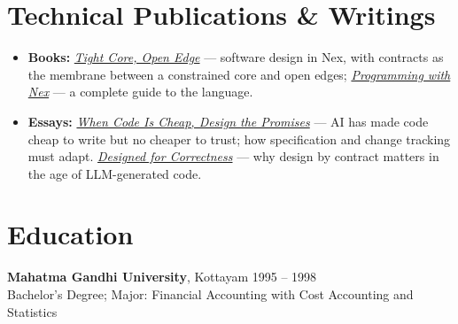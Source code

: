\documentclass[10pt,letterpaper]{article}
\begin{document}
\section*{Technical Publications \& Writings}
\begin{itemize}
  \item \textbf{Books:} \href{https://schemer.in/books/tight-core-open-edge/cover.html}{\textit{Tight Core, Open Edge}} --- software design in Nex, with contracts as the membrane between a constrained core and open edges; \href{https://schemer.in/nex/docs/programming-with-nex/cover.html}{\textit{Programming with Nex}} --- a complete guide to the language.
  \item \textbf{Essays:} \href{https://schemer.in/nex/blog/when-code-is-cheap.html}{\textit{When Code Is Cheap, Design the Promises}} --- AI has made code cheap to write but no cheaper to trust; how specification and change tracking must adapt. \href{https://schemer.in/nex/designed-for-correctness.html}{\textit{Designed for Correctness}} --- why design by contract matters in the age of LLM-generated code.
\end{itemize}

\section*{Education}
\textbf{Mahatma Gandhi University}, Kottayam \hfill {\small\color{muted} 1995 -- 1998}\\
Bachelor's Degree; Major: Financial Accounting with Cost Accounting and Statistics
\end{document}
